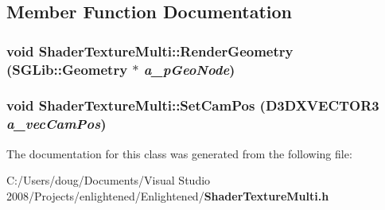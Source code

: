 \subsection{Member Function Documentation}
\subsubsection[{RenderGeometry}]{\setlength{\rightskip}{0pt plus 5cm}void ShaderTextureMulti::RenderGeometry (SGLib::Geometry $\ast$ {\em a\_\-pGeoNode})\hspace{0.3cm}{\ttfamily  [inline]}}\label{class_shader_texture_multi_a2fbc89fdebf09b156d399337b2b39f24}
\subsubsection[{SetCamPos}]{\setlength{\rightskip}{0pt plus 5cm}void ShaderTextureMulti::SetCamPos (D3DXVECTOR3 {\em a\_\-vecCamPos})\hspace{0.3cm}{\ttfamily  [inline]}}\label{class_shader_texture_multi_a30155c23904b627480b7821f85854390}


The documentation for this class was generated from the following file:\begin{DoxyCompactItemize}
\item 
C:/Users/doug/Documents/Visual Studio 2008/Projects/enlightened/Enlightened/{\bf ShaderTextureMulti.h}\end{DoxyCompactItemize}
